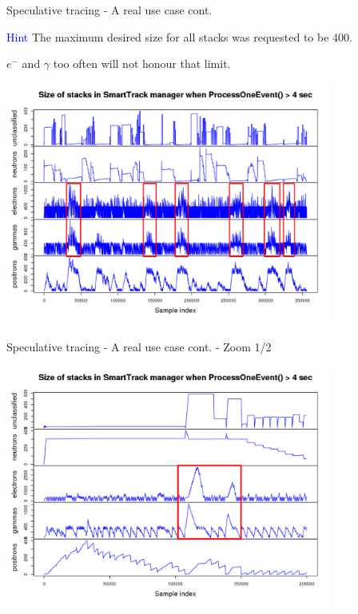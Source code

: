 \documentclass{beamer}
\begin{document}
\begin{frame}{Speculative tracing - A real use case cont.}

\textcolor{blue}{Hint} The maximum desired size for all stacks was requested to be 400.

$e^-$ and $\gamma$ too often will not honour that limit.

\begin{center}
  \includegraphics[width=0.8\textwidth]{pathol-all.png}
\end{center}
\end{frame}

\begin{frame}{Speculative tracing - A real use case cont. - Zoom 1/2}

\begin{center}
  \includegraphics[width=0.8\textwidth]{pathol-zoom1.png}
\end{center}
\end{frame}
\end{document}
